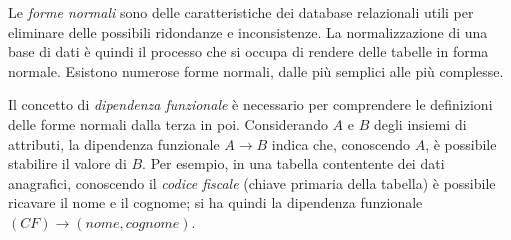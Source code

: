 Le \emph{forme normali} sono delle caratteristiche dei database relazionali utili per eliminare delle possibili ridondanze e inconsistenze. La normalizzazione di una base di dati è quindi il processo che si occupa di rendere delle tabelle in forma normale. Esistono numerose forme normali, dalle più semplici alle più complesse.

Il concetto di \emph{dipendenza funzionale} è necessario per comprendere le definizioni delle forme normali dalla terza in poi. Considerando $A$ e $B$ degli insiemi di attributi, la dipendenza funzionale $A \rightarrow B$ indica che, conoscendo $A$, è possibile stabilire il valore di $B$. Per esempio, in una tabella contentente dei dati anagrafici, conoscendo il \emph{codice fiscale} (chiave primaria della tabella) è possibile ricavare il nome e il cognome; si ha quindi la dipendenza funzionale $(CF) \rightarrow (nome,cognome)$.